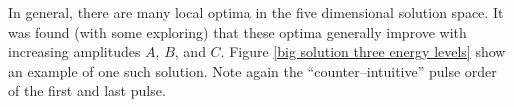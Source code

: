 In general, there are many local optima in the five dimensional solution space. It was found (with some exploring) that these optima generally improve with increasing amplitudes $A$, $B$, and $C$. Figure \ref{big solution three energy levels} show an example of one such solution. Note again the ``counter--intuitive'' pulse order of the first and last pulse.

